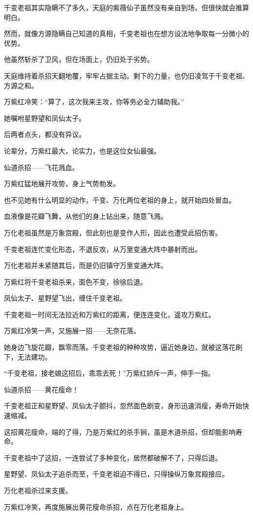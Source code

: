 \begin{this_body}
千变老祖其实隐瞒不了多久，天庭的紫薇仙子虽然没有亲自到场，但很快就会推算明白。

然而，就像方源隐瞒自己知道的真相，千变老祖也在想方设法地争取每一分微小的优势。

他虽然斩杀了卫风，但在场面上，仍旧处于劣势。

天庭维持着杀招天翻地覆，牢牢占据主动。剩下的力量，也仍旧凌驾于千变老祖、方源之和。

万紫红冷笑：“算了，这次我来主攻，你等务必全力辅助我。”

她嘱咐星野望和凤仙太子。

后两者点头，都没有异议。

论辈分，万紫红最大，论实力，也是这位女仙最强。

仙道杀招——飞花溅血。

万紫红猛地展开攻势，身上气势勃发。

也不见她有什么明显的动作，千变、万化两位老祖的身上，就开始四处冒血。

血液像是花瓣飞舞，从他们的身上钻出来，随意飞溅。

万化老祖虽然是万象宫殿，但此刻也是变作人形，因此也遭受此招伤害。

千变老祖连忙变化形态，不退反攻，从万里变通大阵中暴射而出。

万化老祖并未紧随其后，而是仍旧镇守万里变通大阵。

万紫红将千变老祖杀来，面色不变，徐徐后退。

凤仙太子、星野望飞出，缠住千变老祖。

千变老祖一时间无法拉近和万紫红的距离，便连连变化，遥攻万紫红。

万紫红冷笑一声，又施展一招——无奈花落。

她身边飞旋花瓣，飘零而落。千变老祖的种种攻势，逼近她身边，就被这落花刷下，无法建功。

“千变老祖，接老娘这招后，乖乖去死！”万紫红娇斥一声，伸手一指。

仙道杀招——黄花瘦命！

千变老祖正和星野望、凤仙太子颤抖，忽然面色剧变，身形迅速消瘦，寿命开始快速缩减。

这招黄花瘦命，端的了得，乃是万紫红的杀手锏，虽是木道杀招，但却能影响寿命。

千变老祖中了这招，一连尝试了多种变化，居然都破解不了，只得后退。

星野望、凤仙太子追杀而至，千变老祖迫不得已，只得操纵万象宫殿接应。

万化老祖杀过来支援。

万紫红冷笑，再度施展出黄花瘦命杀招，点在万化老祖身上。


\end{this_body}
